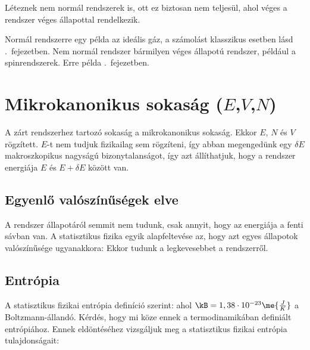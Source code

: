   Léteznek nem normál rendszerek is, ott ez biztosan nem teljesül, ahol véges a rendszer véges állapottal rendelkezik. 
  
  Normál rendszerre egy példa az ideális gáz, a számolást klasszikus esetben lásd .\ fejezetben.
   Nem normál rendszer bármilyen véges állapotú rendszer, például a spinrendszerek.
   Erre példa .\ fejezetben. 
  
 \section{Mikrokanonikus sokaság ($E$,$V$,$N$)}\label{ss:B03-mikrokansok}
  
  A zárt rendszerhez tartozó sokaság a mikrokanonikus sokaság.
   Ekkor $E$, $N$ és $V$ rögzített. $E$-t nem tudjuk fizikailag sem rögzíteni, így abban megengedünk egy $\delta E$ makroszkopikus nagyságú bizonytalanságot, így azt állíthatjuk, hogy a rendszer energiája $E$ és $E+\delta E$ között van. 
  
  \subsection{Egyenlő valószínűségek elve}
   
   A rendszer állapotáról semmit nem tudunk, csak annyit, hogy az energiája a fenti sávban van.
   A statisztikus fizika egyik alapfeltevése az, hogy azt egyes állapotok valószínűsége ugyanakkora:
   Ekkor tudunk a legkevesebbet a rendszerről.
   
  \subsection{Entrópia}
   
   A statisztikus fizikai entrópia definíció szerint:
   ahol $\kB=1,38\cdot 10^{-23}\me{\frac{J}{K}}$ a Boltzmann-állandó.
   Kérdés, hogy mi köze ennek a termodinamikában definiált entrópiához.
   Ennek eldöntéséhez vizsgáljuk meg a statisztikus fizikai entrópia tulajdonságait:
   
